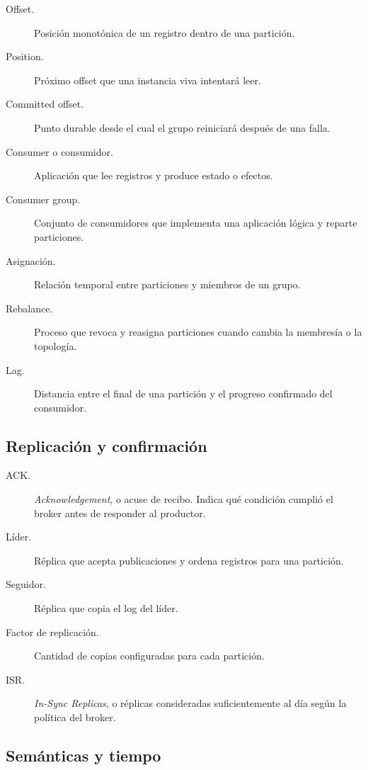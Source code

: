 \documentclass[variant=apuntes,cover=institutional,mode=screen]{ua-engineering-v6-article}
\begin{document}
\begin{description}
\item[Offset.] Posición monotónica de un registro dentro de una partición.
\item[Position.] Próximo offset que una instancia viva intentará leer.
\item[Committed offset.] Punto durable desde el cual el grupo reiniciará después de una falla.
\item[Consumer o consumidor.] Aplicación que lee registros y produce estado o efectos.
\item[Consumer group.] Conjunto de consumidores que implementa una aplicación lógica y reparte particiones.
\item[Asignación.] Relación temporal entre particiones y miembros de un grupo.
\item[Rebalance.] Proceso que revoca y reasigna particiones cuando cambia la membresía o la topología.
\item[Lag.] Distancia entre el final de una partición y el progreso confirmado del consumidor.
\end{description}

\subsection{Replicación y confirmación}

\begin{description}
\item[ACK.] \emph{Acknowledgement}, o acuse de recibo. Indica qué condición cumplió el broker antes de responder al productor.
\item[Líder.] Réplica que acepta publicaciones y ordena registros para una partición.
\item[Seguidor.] Réplica que copia el log del líder.
\item[Factor de replicación.] Cantidad de copias configuradas para cada partición.
\item[ISR.] \emph{In-Sync Replicas}, o réplicas consideradas suficientemente al día según la política del broker.
\end{description}

\subsection{Semánticas y tiempo}
\end{document}
